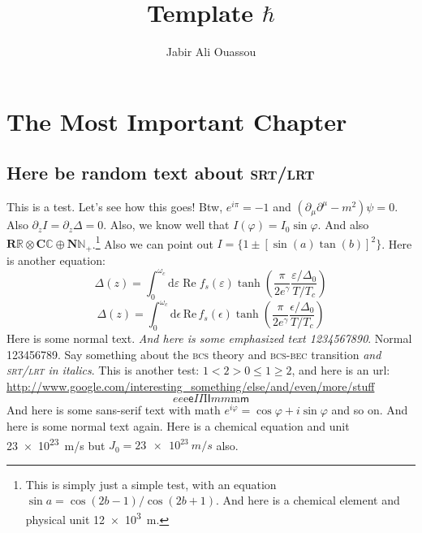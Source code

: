 \documentclass[b5paper,twoside,openright]{scrbook}
\title{Template $\hbar$}
\author{Jabir Ali Ouassou}
\begin{document}
\maketitle %
\frontmatter
\tableofcontents
\mainmatter 

\chapter{The Most Important Chapter}
\section{Here be random text about \textsc{srt/lrt}}
This is a test. Let's see how this goes! Btw, $e^{i\pi} = -1$ and $(\partial_\mu \partial^\mu - m^2) \psi = 0$.
Also $\partial_z I = \partial_z \Delta = 0$.
Also, we know well that $I(\varphi) = I_0 \sin \varphi$.  And also $\mathbf{R}\mathbb{R} \otimes \mathbf{C}\mathbb{C} \oplus \mathbf{N}\mathbb{N}_+$.\footnote{This is simply just a simple test, with an equation $\sin a = \cos(2b-1)/\cos(2b+1)$. And here is a chemical element  and physical unit \SI{12e3}{m}. }
Also we can point out $I = \{ 1 \pm [\sin(a)\tan(b)]^2\} $.
Here is another equation:
\begin{equation}
  Δ(z) = \int_0^{ω_c} \mathrm{d}ε\;\mathrm{Re}\; f_s(ε) \tanh\!\left(\frac{π}{2e^γ} \frac{ε/Δ_0}{T/T_c}\right)
\end{equation}
\begin{equation}
  \Delta(z) = \int_0^{\omega_c} \mathrm{d}\epsilon\,\mathrm{Re}\, f_s(\epsilon) \tanh\!\left(\frac{\pi}{2e^\gamma} \frac{\epsilon/\Delta_0}{T/T_c}\right)
\end{equation}
Here is some normal text. \textit{And here is some emphasized text 1234567890}. Normal 123456789. 
Say something about the \textsc{bcs} theory and \textsc{bcs-bec} transition \emph{and \textsc{srt/lrt} in italics}.
This is another test: $1 < 2 > 0 \leq 1 \geq 2$, and here is an url: \url{http://www.google.com/interesting_something/else/and/even/more/stuff}
\begin{equation}
  \textit{e}e\mathrm{e}\textsf{e}%
  \textit{I}I\mathrm{I}\textsf{I}%
  \textit{m}m\mathrm{m}\textsf{m}%
\end{equation}
\textsf{And here is some sans-serif text with math $e^{i\varphi}=\cos\varphi+i\sin\varphi$ and so on.} And here is some normal text again.
Here is a chemical equation  and unit \SI{23e23}{m/s} but $J_0 = \SI{23e23}{m/s}$ also.
\end{document}
